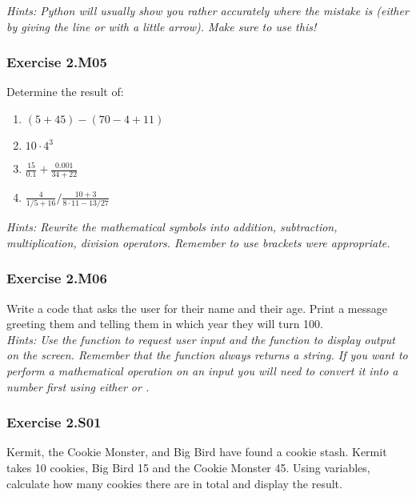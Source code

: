 \textit{Hints:
Python will usually show you rather accurately where the mistake is (either by giving the line or with a little arrow). Make sure to use this!}\\[1cm]




\subsubsection*{Exercise 2.M05 \red{[M]}}
Determine the result of:
\begin{enumerate}[label=(\alph*)]
	\item $(5+45)-(70-4+11)$
	\item $10 \cdot 4^3$
	\item $\frac{15}{0.1} + \frac{0.001}{34+22}$
	\item $\frac{4}{1/5 +16} / \frac{10+3}{8\cdot 11 - 13/27}$
\end{enumerate}


\textit{Hints:
Rewrite the mathematical symbols into addition, subtraction, multiplication, division operators. Remember to use brackets were appropriate.}\\[1cm]




\subsubsection*{Exercise 2.M06}
Write a code that asks the user for their name and their age. Print a message greeting them and telling them in which year they will turn 100.\\


\textit{Hints:
Use the {} function to request user input and the {} function to display output on the screen. Remember that the {} function always returns a string. If you want to perform a mathematical operation on an input you will need to convert it into a number first using either {} or {.}}\\[1cm]




\subsubsection*{Exercise 2.S01}
Kermit, the Cookie Monster, and Big Bird have found a cookie stash. Kermit takes 10 cookies,
Big Bird 15 and the Cookie Monster 45. Using variables, calculate how many cookies there are in total and display the result.\\


